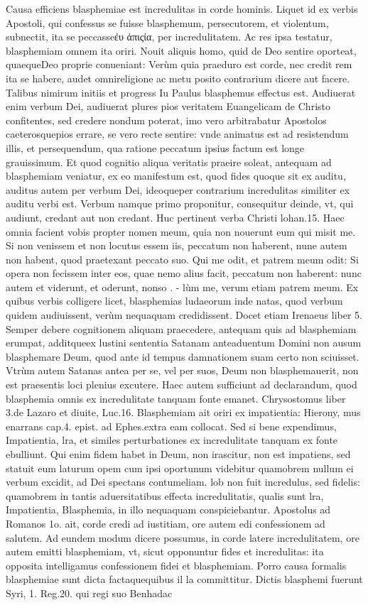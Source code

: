 \documentclass{article}
\begin{document}
\begin{pages}
\marginpar{[ p.36 ]}\pstart Causa efficiens blasphemiae est incredulitas in corde hominis. Liquet id ex verbis Apostoli, qui confessus se fuisse blasphemum, persecutorem, et violentum, subnectit, ita se peccasseἐυ ἀπιςία, per incredulitatem. Ac res ipsa testatur, blasphemiam omnem ita oriri. Nouit aliquis homo, quid de Deo sentire oporteat, quaequeDeo proprie conueniant: Verùm quia praeduro est corde, nec credit rem ita se habere, audet omnireligione ac metu posito contrarium dicere aut facere. Talibus nimirum initiis et progress Iu Paulus blasphemus effectus est. Audiuerat enim verbum Dei, audiuerat plures pios veritatem Euangelicam de Christo confitentes, sed credere nondum poterat, imo vero arbitrabatur Apostolos caeterosquepios errare, se vero recte sentire: vnde animatus est ad resistendum illis, et persequendum, qua ratione peccatum ipsius factum est longe grauissimum. Et quod cognitio aliqua veritatis praeire soleat, antequam ad blasphemiam veniatur, ex eo manifestum est, quod fides quoque sit ex auditu, auditus autem per verbum Dei, ideoqueper contrarium incredulitas similiter ex auditu verbi est. Verbum namque primo proponitur, consequitur deinde, vt, qui audiunt, credant aut non credant. Huc pertinent verba Christi lohan.15. Haec omnia facient vobis propter nomen meum, quia non nouerunt eum qui misit me. Si non venissem et non locutus essem iis, peccatum non haberent, nune autem non habent, quod praetexant peccato suo. Qui me odit, et patrem meum odit: Si opera non fecissem inter eos, quae nemo alius facit, peccatum non haberent: nunc autem et viderunt, et oderunt, nonso . - lùm me, verum etiam patrem meum. Ex quibus verbis colligere licet, blasphemias ludaeorum inde natas, quod verbum quidem audiuissent, verùm nequaquam credidissent. Docet etiam Irenaeus liber 5. Semper debere cognitionem aliquam praecedere, antequam quis ad blasphemiam erumpat, additqueex lustini sententia Satanam anteaduentum Domini non ausum blasphemare Deum, quod ante id tempus damnationem suam certo non sciuisset. Vtrùm autem Satanas antea per se, vel per suos, Deum non blasphemauerit, non est praesentis loci plenius excutere. Haec autem sufficiunt ad declarandum, quod blasphemia omnis ex incredulitate tanquam fonte emanet. Chrysostomus liber 3.de Lazaro et diuite, Luc.16. Blasphemiam ait oriri ex impatientia: Hierony, mus enarrans cap.4. epist. ad Ephes.extra eam collocat. Sed si bene expendimus, Impatientia, lra, et similes perturbationes ex incredulitate tanquam ex fonte ebulliunt. Qui enim fidem habet in Deum, non irascitur, non est impatiens, sed statuit eum laturum opem cum ipsi oportunum videbitur quamobrem nullum ei verbum excidit, ad Dei spectans contumeliam. lob non fuit incredulus, sed fidelis: quamobrem in tantis aduersitatibus effecta incredulitatis, qualis sunt lra, Impatientia, Blasphemia, in illo nequaquam conspiciebantur. Apostolus ad Romanos 1o. ait, corde credi ad iustitiam, ore autem edi confessionem ad salutem. Ad eundem modum dicere possumus, in corde latere incredulitatem, ore autem emitti blasphemiam, vt, sicut opponuntur fides et incredulitas: ita opposita intelligamus confessionem fidei et blasphemiam. Porro causa formalis blasphemiae sunt dicta factaquequibus il la committitur. Dictis blasphemi fuerunt Syri, 1. Reg.20. qui regi suo Benhadac 
\end{pages}
\end{document}
